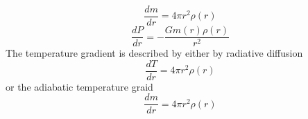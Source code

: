 \begin{equation}
    \frac{dm}{dr} = 4\pi r^2 \rho(r)
\end{equation}
\begin{equation}
    \frac{dP}{dr} = -\frac{G m(r)\rho(r)}{r^2}
\end{equation}
The temperature gradient is described by either by radiative diffusion
\begin{equation}
    \frac{dT}{dr} = 4\pi r^2 \rho(r)
\end{equation}
or the adiabatic temperature graid
\begin{equation}
    \frac{dm}{dr} = 4\pi r^2 \rho(r)
\end{equation}